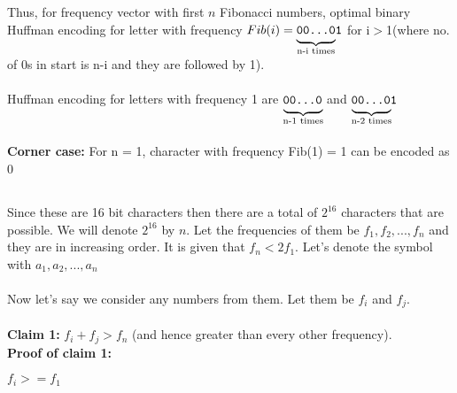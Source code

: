 \documentclass{article}
\begin{document}
Thus, for frequency vector with first $n$ Fibonacci numbers, optimal binary Huffman encoding for letter with frequency $Fib(i) =\mathrlap{\underbrace{\phantom{\texttt{00...0\strut}}}_{\text{n-i times}}}\texttt{00...0}%
\texttt{1}%
$ for i$>$1(where no. of 0s in start is n-i and they are followed by 1).
\\\\
Huffman encoding for letters with frequency 1 are 
$
\mathrlap{\underbrace{\phantom{\texttt{00...0\strut}}}_{\text{n-1 times}}}\texttt{00...0}%
$
and 
$ 
\mathrlap{\underbrace{\phantom{\texttt{00...0\strut}}}_{\text{n-2 times}}}\texttt{00...0}%
\texttt{1}%
$
\\\\\textbf{Corner case:} For n = 1, character with frequency Fib(1) = 1 can be encoded as 0
\newpage
\subsection{}

Since these are 16 bit characters then there are a total of $2^{16}$ characters that are possible. We will denote $2^{16}$ by $n$. Let the frequencies of them be $f_1, f_2, ... , f_n$ and they are in increasing order. It is given that $f_n < 2f_1$. Let's denote the symbol with $a_1, a_2, ... ,a_n$
\\\\
Now let's say we consider any numbers from them. Let them be $f_i$ and $f_j$. 
\\\\
\textbf{Claim 1:} $f_i+f_j > f_n$ (and hence greater than every other frequency).
\\ 
\textbf{Proof of claim 1:}

$f_i >= f_1$
\end{document}
